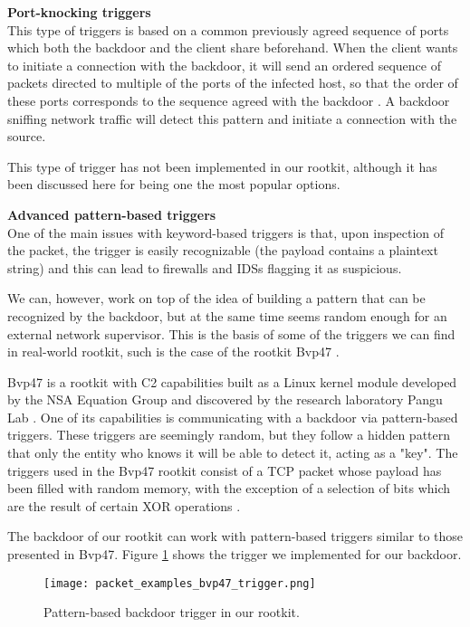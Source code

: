 \textbf{Port-knocking triggers}\\
This type of triggers is based on a common previously agreed sequence of ports which both the backdoor and the client share beforehand. When the client wants to initiate a connection with the backdoor, it will send an ordered sequence of packets directed to multiple of the ports of the infected host, so that the order of these ports corresponds to the sequence agreed with the backdoor \cite{port_knocking}. A backdoor sniffing network traffic will detect this pattern and initiate a connection with the source.

This type of trigger has not been implemented in our rootkit, although it has been discussed here for being one the most popular options.

\textbf{Advanced pattern-based triggers}\\
One of the main issues with keyword-based triggers is that, upon inspection of the packet, the trigger is easily recognizable (the payload contains a plaintext string) and this can lead to firewalls and IDSs flagging it as suspicious. 

We can, however, work on top of the idea of building a pattern that can be recognized by the backdoor, but at the same time seems random enough for an external network supervisor. This is the basis of some of the triggers we can find in real-world rootkit, such is the case of the rootkit Bvp47 \cite{bvp47_report}. %

Bvp47 is a rootkit with C2 capabilities built as a Linux kernel module developed by the NSA Equation Group and discovered by the research laboratory Pangu Lab \cite{pangu_lab}. One of its capabilities is communicating with a backdoor via pattern-based triggers. These triggers are seemingly random, but they follow a hidden pattern that only the entity who knows it will be able to detect it, acting as a "key". The triggers used in the Bvp47 rootkit consist of a TCP packet whose payload has been filled with random memory, with the exception of a selection of bits which are the result of certain XOR operations \cite{bvp47_report_p49}.

The backdoor of our rootkit can work with pattern-based triggers similar to those presented in Bvp47. Figure \ref{fig:bvp47_trigger} shows the trigger we implemented for our backdoor.

\begin{figure}[htbp]
	\centering
	\texttt{[image: packet\_examples\_bvp47\_trigger.png]}
	\caption{Pattern-based backdoor trigger in our rootkit.}
	\label{fig:bvp47_trigger}
\end{figure}

